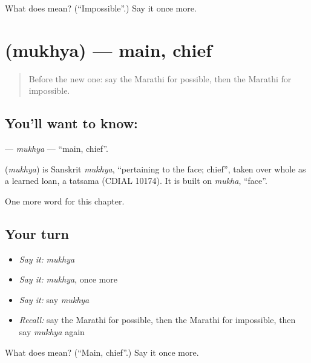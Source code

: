 \begin{tcolorbox}[breakable,colback=teal!4,colframe=teal!35!black,title={Before you move on}]
What does  mean? (\textquotedblleft{}Impossible\textquotedblright{}.) Say it once more.
\end{tcolorbox}
\section[\texorpdfstring{\mr{मुख्य} (mukhya)}{मुख्य (mukhya)}]{ (mukhya) — main, chief}

\label{lesson:MR-C176-mukhya}



\begin{quote}
Before the new one: say the Marathi for possible, then the Marathi for impossible.
\end{quote}

\subsection*{You'll want to know: }
\textbf{} — \emph{mukhya} — \textquotedblleft{}main, chief\textquotedblright{}.

\begin{cousinweb}
\textbf{} (\emph{mukhya}) is Sanskrit \emph{mukhya}, \textquotedblleft{}pertaining to the face; chief\textquotedblright{}, taken over whole as a learned loan, a tatsama (CDIAL 10174). It is built on \emph{mukha}, \textquotedblleft{}face\textquotedblright{}.
\end{cousinweb}

\begin{grammarlens}[title={What you've built}]
One more word for this chapter.
\end{grammarlens}

\subsection*{Your turn}
\begin{itemize}
\raggedright
  \item \emph{Say it:} \emph{mukhya}
  \item \emph{Say it:} \emph{mukhya}, once more
  \item \emph{Say it:} say \emph{mukhya}
  \item \emph{Recall:} say the Marathi for possible, then the Marathi for impossible, then say \emph{mukhya} again
\end{itemize}

\begin{tcolorbox}[breakable,colback=teal!4,colframe=teal!35!black,title={Before you move on}]
What does  mean? (\textquotedblleft{}Main, chief\textquotedblright{}.) Say it once more.
\end{tcolorbox}
